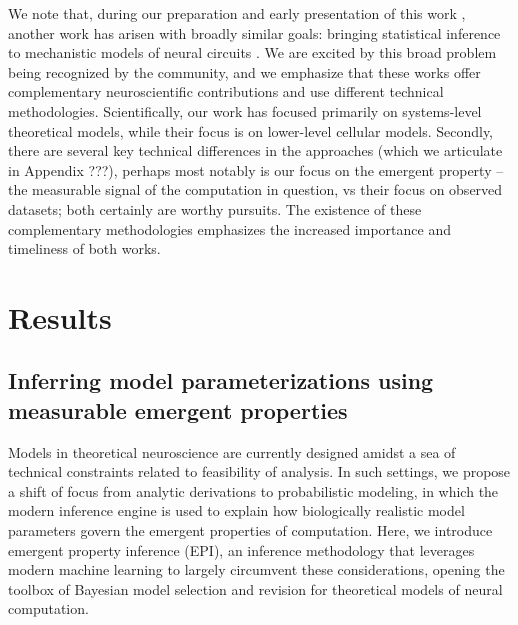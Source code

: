 \documentclass[11pt]{article}
\begin{document}
We note that, during our preparation and early presentation of this work \cite{bittnerCOSYNE2019, bittnerBernstein2019}, another work has arisen with broadly similar goals: bringing statistical inference to mechanistic models of neural circuits \cite{mackeBernstein2019poster}.  We are excited by this broad problem being recognized by the community, and we emphasize that these works offer complementary neuroscientific contributions and use different technical methodologies.
Scientifically, our work has focused primarily on systems-level theoretical models, while their focus is on lower-level cellular models.
Secondly, there are several key technical differences in the approaches (which we articulate in Appendix ???), perhaps most notably is our focus on the emergent property -- the measurable signal of the computation in question, vs their focus on observed datasets; both certainly are worthy pursuits.
The existence of these complementary methodologies emphasizes the increased importance and timeliness of both works. 






\section{Results}
\subsection{Inferring model parameterizations using measurable emergent properties}
Models in theoretical neuroscience are currently designed amidst a sea of technical constraints related to feasibility of analysis.
In such settings, we propose a shift of focus from analytic derivations to probabilistic modeling, in which the modern inference engine is used to explain how biologically realistic model parameters govern the emergent properties of computation.
Here, we introduce emergent property inference (EPI), an inference methodology that  leverages modern machine learning to largely circumvent these considerations, opening the toolbox of Bayesian model selection and revision for theoretical models of neural computation.  
\end{document}
